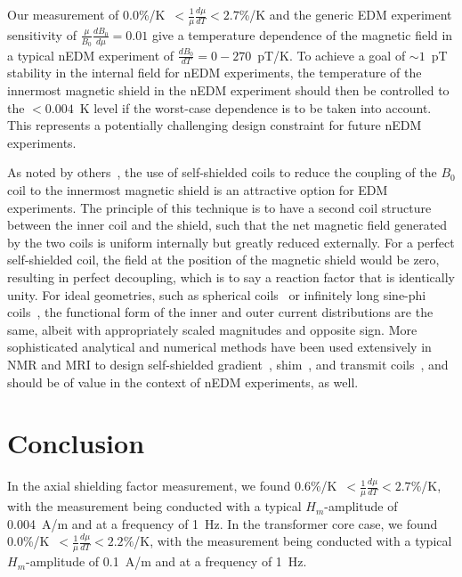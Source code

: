 Our measurement of
0.0\%/K~$<\frac{1}{\mu}\frac{d\mu}{dT}<2.7$\%/K and the generic EDM
experiment sensitivity of $\frac{\mu}{B_0}\frac{dB_0}{d\mu}=0.01$
give a temperature dependence of the magnetic field in a typical
nEDM experiment of $\frac{dB_0}{dT}=0-270$~pT/K.  To achieve a goal of
$\sim 1$~pT stability in the internal field for nEDM experiments, the
temperature of the innermost magnetic shield in the nEDM experiment
should then be controlled to the $<0.004$~K level if the worst-case
dependence is to be taken into account.  This represents a potentially
challenging design constraint for future nEDM experiments.

As noted by others~\cite{khriplovich1997cp}, the use of
self-shielded coils to reduce the coupling of the $B_0$ coil to the
innermost magnetic shield is an attractive option for EDM experiments.
The principle of this technique is to have a second coil structure
between the inner coil and the shield, such that the net magnetic
field generated by the two coils is uniform internally but greatly
reduced externally.  For a perfect self-shielded coil, the field at
the position of the magnetic shield would be zero, resulting in
perfect decoupling, which is to say a reaction factor that is
identically unity.  For ideal geometries, such as spherical
coils~\cite{brown1945fluxball, wheeler1958spherical,purcell1989} or infinitely long
sine-phi coils~\cite{bethBNL,bethUSpatent,bidinosti2005}, the
functional form of the inner and outer current distributions are the
same, albeit with appropriately scaled magnitudes and opposite sign.
More sophisticated analytical and numerical methods have been used
extensively in NMR and MRI to design self-shielded
gradient~\cite{turner1986,hidalgo},
shim~\cite{brideson,forbes}, and transmit
coils~\cite{bidinosti2005,kuzmin}, and should be of value in the
context of nEDM experiments, as well.


\section{Conclusion}

In the axial shielding factor measurement, we found
0.6\%/K~$<\frac{1}{\mu}\frac{d\mu}{dT}<2.7\%$/K, with the measurement
being conducted with a typical $H_m$-amplitude of 0.004~A/m and at a
frequency of 1~Hz.  In the transformer core case, we found
0.0\%/K~$<\frac{1}{\mu}\frac{d\mu}{dT}<2.2\%$/K, with the measurement
being conducted with a typical $H_m$-amplitude of 0.1~A/m and at a
frequency of 1~Hz.

